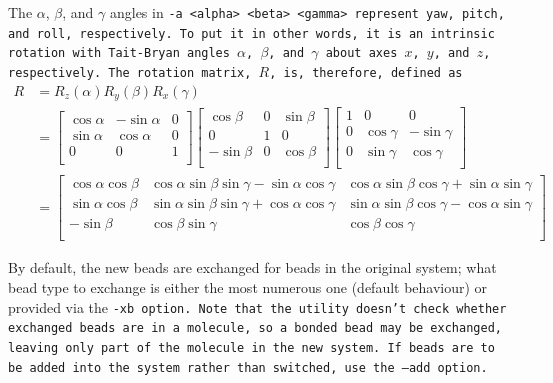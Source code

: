 The $\alpha$, $\beta$, and $\gamma$ angles in \tt{-a <alpha> <beta> <gamma>}
represent yaw, pitch, and roll, respectively. To put it in other words, it is an
intrinsic rotation with Tait-Bryan angles $\alpha$, $\beta$, and $\gamma$ about
axes $x$, $y$, and $z$, respectively. The rotation matrix, $R$, is, therefore,
defined as
\begin{equation}
  \begin{aligned}
  R &= R_z(\alpha) R_y(\beta) R_x(\gamma)\\
    &= \left[
    \begin{array}{ccc}
      \cos\alpha & -\sin\alpha & 0\\
      \sin\alpha &  \cos\alpha & 0\\
      0          & 0           & 1\\
    \end{array} \right]
    \left[
    \begin{array}{ccc}
      \cos\beta  & 0           & \sin\beta\\
      0          & 1           & 0\\
      -\sin\beta & 0           & \cos\beta\\
    \end{array} \right]
    \left[
    \begin{array}{ccc}
      1          & 0           & 0\\
      0          & \cos\gamma  & -\sin\gamma\\
      0          & \sin\gamma  & \cos\gamma\\
    \end{array} \right]\\
    &= \left[
    \begin{array}{ccc}
      \cos\alpha\cos\beta &
        \cos\alpha \sin\beta \sin\gamma - \sin\alpha \cos\gamma &
        \cos\alpha \sin\beta \cos\gamma + \sin\alpha \sin\gamma \\
      \sin\alpha\cos\beta &
        \sin\alpha \sin\beta \sin\gamma + \cos\alpha \cos\gamma &
        \sin\alpha \sin\beta \cos\gamma - \cos\alpha \sin\gamma \\
      -\sin\beta & \cos\beta \sin\gamma & \cos\beta \cos\gamma \\
    \end{array} \right]
  \end{aligned}
\end{equation}

By default, the new beads are exchanged for beads in the original system; what
bead type to exchange is either the most numerous one (default behaviour) or
provided via the \tt{-xb} option. Note that the utility doesn't check whether
exchanged beads are in a molecule, so a bonded bead may be exchanged, leaving
only part of the molecule in the new system. If beads are to be added into the
system rather than switched, use the \tt{--add} option.

